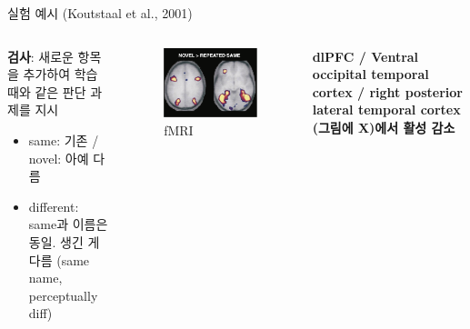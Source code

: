 \documentclass{beamer}
\begin{document}
\begin{frame}{실험 예시 (Koutstaal et al., 2001)}
\begin{columns}
\begin{column}{0.4\textwidth}
      \textbf{검사}: 새로운 항목을 추가하여 학습 때와 같은 판단 과제를 지시
      \vspace{-0.5em}
      \begin{itemize}
        \setlength{\itemsep}{0em}
        \setlength{\parskip}{0em}
        \item same: 기존 / novel: 아예 다름
        \item different: same과 이름은 동일. 생긴 게 다름 (same name, perceptually diff)
      \end{itemize}
    \end{column}
    \hfill
    \begin{column}{0.58\textwidth}
      \begin{columns}
        \begin{column}{0.55\textwidth}
          \begin{figure}
            \centering
            \includegraphics[width=\textwidth]{image/Koutstaal_fmri}
            \caption{fMRI}
          \end{figure}
        \end{column}
        \begin{column}{0.45\textwidth}
          \textbf{dlPFC / Ventral occipital temporal cortex / right posterior lateral temporal cortex (그림에 X)에서 활성 감소}
        \end{column}
      \end{columns}
      \vspace{-1em}
      \begin{columns}
        \begin{column}{0.6\textwidth}
          \begin{figure}

\end{figure}
\end{column}
\end{columns}
\end{column}
\end{columns}
\end{frame}
\end{document}
